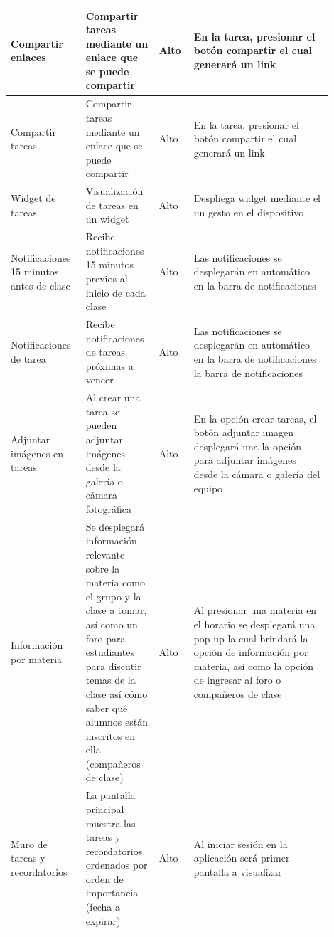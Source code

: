 \documentclass[10pt]{article}
\begin{document}
\begin{longtable}{|p{0.2\linewidth}|p{0.2\linewidth}|p{0.1\linewidth}|p{0.4\linewidth}|}
{Compartir enlaces} & {Compartir tareas mediante un enlace que se puede compartir} & {Alto} & {En la tarea, presionar el botón compartir el cual generará un link} \\ \hline

{Compartir tareas} & {Compartir tareas mediante un enlace que se puede compartir} & {Alto} & {En la tarea, presionar el botón compartir el cual generará un link} \\ \hline

{Widget de tareas} & {Visualización de tareas en un widget} & {Alto} & {Despliega widget mediante el un gesto en el dispositivo} \\ \hline

{Notificaciones 15 minutos antes de clase} & {Recibe notificaciones 15 minutos previos al inicio de cada clase} & {Alto} & {Las notificaciones se desplegarán en automático en la barra de notificaciones} \\ \hline

{Notificaciones de tarea} & {Recibe notificaciones de tareas próximas a vencer} & {Alto} & {Las notificaciones se desplegarán en automático en la barra de notificaciones la barra de notificaciones} \\ \hline

{Adjuntar imágenes en tareas} & {Al crear una tarea se pueden adjuntar imágenes desde la galería o cámara fotográfica} & {Alto} & {En la opción crear tareas, el botón adjuntar imagen desplegará una la opción para adjuntar imágenes desde la cámara o galería del equipo} \\ \hline

{Información por materia} & {Se desplegará información relevante sobre la materia como el grupo y la clase a tomar, así como un foro para estudiantes para discutir temas de la clase así cómo saber qué alumnos están inscritos en ella (compañeros de clase)} & {Alto} & {Al presionar una materia en el horario se desplegará una pop-up la cual brindará la opción de información por materia, así como la opción de ingresar al foro o compañeros de clase} \\ \hline

{Muro de tareas y recordatorios} & {La pantalla principal muestra las tareas y recordatorios ordenados por orden de importancia (fecha a expirar)} & {Alto} & {Al iniciar sesión en la aplicación será primer pantalla a visualizar} \\ \hline
\end{longtable}
\justify
\end{document}
